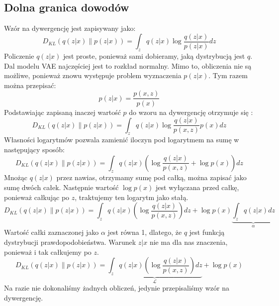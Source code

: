 \documentclass[a4paper,12pt,oneside]{book} %
\begin{document}
\subsection{Dolna granica dowodów}
Wzór na dywergencję jest zapisywany jako:
\begin{equation}
	D_{KL}(q(z|x)\|p(z|x))=\displaystyle\int_{z}^{}q(z|x)\log\frac{q(z|x)}{p(z|x)}dz
	\label{kld1}
\end{equation}
Policzenie $q(z|x)$ jest proste, ponieważ sami dobieramy, jaką dystrybucją jest $q$. Dal modelu VAE najczęściej jest to rozkład normalny. Mimo to, obliczenia nie są możliwe, ponieważ znowu występuje problem wyznaczenia $p(z|x)$. Tym razem można przepisać:
\begin{equation}
	p(z|x)=\dfrac{p(x,z)}{p(x)}
	\label{bayesinaczej}
\end{equation}
Podstawiając zapisaną inaczej wartość $p$ do wzoru na dywergencję otrzymuje się \cite{filmik1}:
\begin{equation}
	D_{KL}(q(z|x)\|p(z|x))=\displaystyle\int_{z}^{}q(z|x)\log\frac{q(z|x)}{p(x,z)}p(x)dz
	\label{kldlogarytmy}
\end{equation}
Własności logarytmów pozwala zamienić iloczyn pod logarytmem na sumę w następujący sposób:
\begin{equation}
	D_{KL}(q(z|x)\|p(z|x))=\displaystyle\int_{z}^{}q(z|x)\left( \log\frac{q(z|x)}{p(x,z)} + \log p(x)\right) dz
	\label{kldcalka}
\end{equation}
Mnożąc $q(z|x)$ przez nawias, otrzymamy sumę pod całką, można zapisać jako sumę dwóch całek. Następnie wartość $\log p(x)$ jest wyłączana przed całkę, ponieważ całkując po $z$, traktujemy ten logarytm jako stałą.
\begin{equation}
	D_{KL}(q(z|x)\|p(z|x))=\displaystyle\int_{z}^{}q(z|x)\left( \log\frac{q(z|x)}{p(x,z)}\right)dz + \log p(x)\underbrace{\displaystyle\int_{z}^{}q(z|x)dz}_{\text{$\alpha$}}
	\label{calkaalpha}
\end{equation}
Wartość całki zaznaczonej jako $\alpha$ jest równa 1, dlatego, że $q$ jest funkcją dystrybucji prawdopodobieństwa. Warunek $z|x$ nie ma dla nas znaczenia, ponieważ i tak całkujemy po $z$.
\begin{equation}
	D_{KL}(q(z|x)\|p(z|x))=\underbrace{\displaystyle\int_{z}^{}q(z|x)\left( \log\frac{q(z|x)}{p(x,z)}\right)dz}_{\text{$\mathcal{L}$}} + \log p(x)
	\label{kldfinal}
\end{equation}
Na razie nie dokonaliśmy żadnych obliczeń, jedynie przepisaliśmy wzór na dywergencję.
\end{document}
